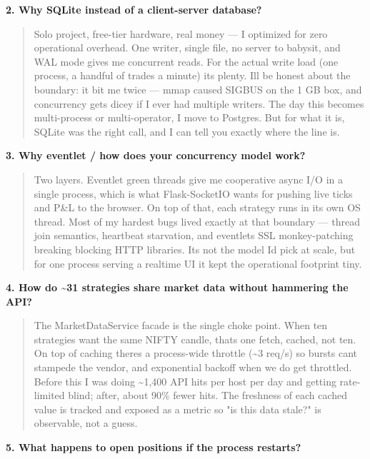 \documentclass[11pt]{article}
\begin{document}
\textbf{2. Why SQLite instead of a client-server database?}

\begin{quote}
Solo project, free-tier hardware, real money --- I optimized for zero operational overhead. One
writer, single file, no server to babysit, and WAL mode gives me concurrent reads. For the
actual write load (one process, a handful of trades a minute) it\textquotesingle s plenty. I\textquotesingle ll be honest about
the boundary: it bit me twice --- mmap caused SIGBUS on the 1 GB box, and concurrency gets dicey
if I ever had multiple writers. The day this becomes multi-process or multi-operator, I move to
Postgres. But for what it is, SQLite was the right call, and I can tell you exactly where the
line is.
\end{quote}

\textbf{3. Why eventlet / how does your concurrency model work?}

\begin{quote}
Two layers. Eventlet green threads give me cooperative async I/O in a single process, which is
what Flask-SocketIO wants for pushing live ticks and P\&L to the browser. On top of that, each
strategy runs in its own OS thread. Most of my hardest bugs lived exactly at that boundary ---
thread join semantics, heartbeat starvation, and eventlet\textquotesingle s SSL monkey-patching breaking
blocking HTTP libraries. It\textquotesingle s not the model I\textquotesingle d pick at scale, but for one process serving a
realtime UI it kept the operational footprint tiny.
\end{quote}

\textbf{4. How do \textasciitilde31 strategies share market data without hammering the API?}

\begin{quote}
The MarketDataService facade is the single choke point. When ten strategies want the same NIFTY
candle, that\textquotesingle s one fetch, cached, not ten. On top of caching there\textquotesingle s a process-wide throttle
(\textasciitilde3 req/s) so bursts can\textquotesingle t stampede the vendor, and exponential backoff when we do get
throttled. Before this I was doing \textasciitilde1,400 API hits per host per day and getting rate-limited
blind; after, about 90\% fewer hits. The freshness of each cached value is tracked and exposed
as a metric so "is this data stale?" is observable, not a guess.
\end{quote}

\textbf{5. What happens to open positions if the process restarts?}
\end{document}
